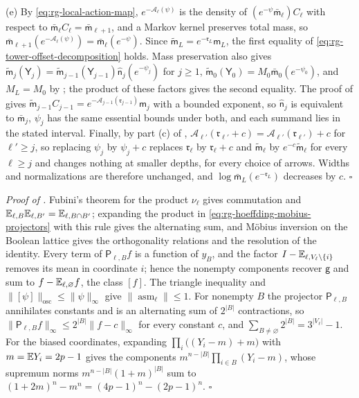 (e) By \eqref{eq:rg-local-action-map}, $e^{-\mathcal A_\ell(\psi)}$ is the density of
$(e^{-\psi}\bar{\mathsf m}_\ell)C_\ell$ with respect to
$\bar{\mathsf m}_\ell C_\ell=\bar{\mathsf m}_{\ell+1}$, and a Markov kernel preserves
total mass, so
$\bar{\mathsf m}_{\ell+1}(e^{-\mathcal A_\ell(\psi)})=\bar{\mathsf m}_\ell(e^{-\psi})$.
Since $\widetilde{\mathsf m}_L=e^{-\mathfrak r_L}\mathsf m_L$, the first equality of
\eqref{eq:rg-tower-offset-decomposition} holds. Mass preservation also gives
$\widetilde{\mathsf m}_j(\mathsf Y_j)=\widetilde{\mathsf m}_{j-1}(\mathsf
Y_{j-1})\widehat{\mathsf n}_j(e^{-\psi_j})$ for $j\ge1$,
$\widetilde{\mathsf m}_0(\mathsf Y_0)=M_0\bar{\mathsf m}_0(e^{-\psi_0})$, and
$M_L=M_0$ by ; the product of these factors
gives the second equality. The proof of
 gives
$\widetilde{\mathsf m}_{j-1}C_{j-1}=e^{-\mathcal A_{j-1}(\mathfrak r_{j-1})}\mathsf m_j$
with a bounded exponent, so $\widehat{\mathsf n}_j$ is equivalent to
$\bar{\mathsf m}_j$, $\psi_j$ has the same essential bounds under both, and each
summand lies in the stated interval. Finally, by part (c) of
,
$\mathcal A_{\ell'}(\mathfrak r_{\ell'}+c)=\mathcal A_{\ell'}(\mathfrak r_{\ell'})+c$ for $\ell'\ge j$, so replacing $\psi_j$
by $\psi_j+c$ replaces $\mathfrak r_\ell$ by $\mathfrak r_\ell+c$ and
$\widetilde{\mathsf m}_\ell$ by $e^{-c}\widetilde{\mathsf m}_\ell$ for every
$\ell\ge j$ and changes nothing at smaller depths, for every choice of arrows. Widths
and normalizations are therefore unchanged, and
$\log\bar{\mathsf m}_L(e^{-\mathfrak r_L})$ decreases by $c$. $\square$

\noindent\emph{Proof of .}
Fubini's theorem for the product $\nu_\ell$ gives commutation and
$\mathbb E_{\ell,B}\mathbb E_{\ell,B'}=\mathbb E_{\ell,B\cap B'}$; expanding the
product in \eqref{eq:rg-hoeffding-mobius-projectors} with this rule gives the
alternating sum, and M\"obius inversion on the Boolean lattice gives the
orthogonality relations and the resolution of the identity. Every term of
$\mathsf P_{\ell,B}f$ is a function of $y_B$, and the factor
$I-\mathbb E_{\ell,V_\ell\setminus\{i\}}$ removes its mean in coordinate $i$; hence
the nonempty components recover $\mathsf g$ and sum to
$f-\mathbb E_{\ell,\varnothing}f$, the class $[f]$. The triangle inequality and
$\lVert[\psi]\rVert_{\mathrm{osc}}\le\lVert\psi\rVert_\infty$ give
$\lVert\operatorname{asm}_\ell\rVert\le1$. For nonempty $B$ the projector
$\mathsf P_{\ell,B}$ annihilates constants and is an alternating sum of
$2^{\lvert B\rvert}$ contractions, so
$\lVert\mathsf P_{\ell,B}f\rVert_\infty\le2^{\lvert B\rvert}\lVert f-c\rVert_\infty$
for every constant $c$, and
$\sum_{B\ne\varnothing}2^{\lvert B\rvert}=3^{\lvert V_\ell\rvert}-1$. For the
biased coordinates, expanding $\prod_i\bigl((Y_i-m)+m\bigr)$ with
$m=\mathbb E Y_i=2p-1$ gives the components $m^{n-\lvert B\rvert}\prod_{i\in B}(Y_i-m)$,
whose supremum norms $m^{n-\lvert B\rvert}(1+m)^{\lvert B\rvert}$ sum to
$(1+2m)^n-m^n=(4p-1)^n-(2p-1)^n$. $\square$


